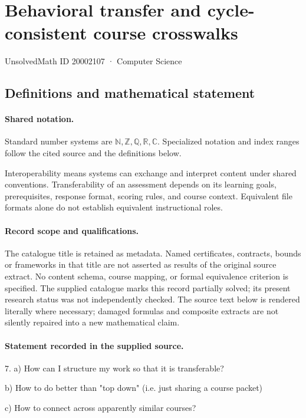 \documentclass[11pt]{article}
\begin{document}
\setcounter{section}{20002106}
\section{Behavioral transfer and cycle-consistent course crosswalks}\label{20002107}
{\small\sffamily UnsolvedMath ID 20002107 · Computer Science}
\subsection{Definitions and mathematical statement}

\paragraph{Shared notation.}Standard number systems are $\mathbb N,\mathbb Z,\mathbb Q,\mathbb R,\mathbb C$. Specialized notation and index ranges follow the cited source and the definitions below.


Interoperability means systems can exchange and interpret content under shared conventions. Transferability of an assessment depends on its learning goals, prerequisites, response format, scoring rules, and course context. Equivalent file formats alone do not establish equivalent instructional roles.
\paragraph{Record scope and qualifications.}
The catalogue title is retained as metadata. Named certificates, contracts, bounds or frameworks in that title are not asserted as results of the original source extract.
No content schema, course mapping, or formal equivalence criterion is specified. The supplied catalogue marks this record partially solved; its present research status was not independently checked.
The source text below is rendered literally where necessary; damaged formulas and composite extracts are not silently repaired into a new mathematical claim.
\paragraph{Statement recorded in the supplied source.}
7. a) How can I structure my work so that it is transferable?

b) How to do better than "top down" (i.e. just sharing a course packet)

c) How to connect across apparently similar courses?
\end{document}

